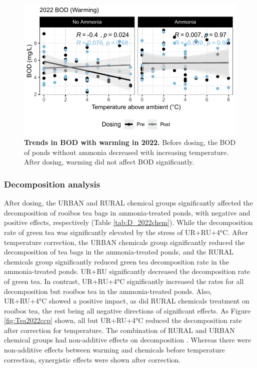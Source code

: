 \documentclass[11pt, a4paper]{article}
\begin{document}
\begin{spacing}{1.5}
\begin{figure}[H]
    \centering
    \includegraphics[scale=1]{./Figures/Regression_BOD}
    \caption{\textbf{Trends in BOD with warming in 2022.} Before dosing, the BOD of ponds without ammonia decreased with increasing temperature. After dosing, warming did not affect BOD significantly.}
    \label{fig:BOD2022Regression}
\end{figure}

\subsubsection{Decomposition analysis}

After dosing, the URBAN and RURAL chemical groups significantly affected the decomposition of rooibos tea bags in ammonia-treated ponds, with negative and positive effects, respectively (Table \ref{tab:D_2022chem}). While the decomposition rate of green tea was significantly elevated by the stress of UR+RU+4°C. After temperature correction, the URBAN chemicals group significantly reduced the decomposition of tea bags in the ammonia-treated ponds, and the RURAL chemicals group significantly reduced green tea decomposition rate in the ammonia-treated ponds. UR+RU significantly decreased the decomposition rate of green tea. In contrast, UR+RU+4°C significantly increased the rates for all decomposition but rooibos tea in the ammonia-treated ponds. Also, UR+RU+4°C  showed a positive impact, as did RURAL chemicals treatment on rooibos tea, the rest being all negative directions of significant effects. As Figure \ref{fig:Tea2022ccp} shown, all but UR+RU+4°C reduced the decomposition rate after correction for temperature. The combination of RURAL and URBAN chemical groups had non-additive effects on decomposition . Whereas there were non-additive effects between warming and chemicals before temperature correction, synergistic effects were shown after correction.


\end{spacing}
\end{document}
